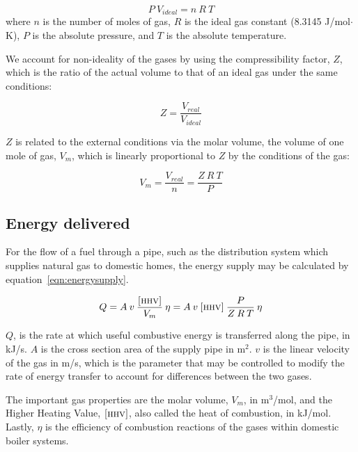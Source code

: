 \documentclass[5p]{elsarticle} %
\begin{document}
\begin{equation}
    \label{eqn:ideal}
    P \: V_{ideal} = n \: R \: T
\end{equation}
where $n$ is the number of moles of gas, $R$ is the ideal gas constant (8.3145 J/mol$\cdot$K), $P$ is the absolute pressure, and $T$ is the absolute temperature.

We account for non-ideality of the gases by using the compressibility factor, $Z$, which is the ratio of the actual volume to that of an ideal gas under the same conditions:

\begin{equation}
    \label{eqn:compressiblity}
    Z = \frac{V_{real}}{V_{ideal}}
\end{equation}

$Z$ is related to the external conditions via the molar volume, the volume of one mole of gas, $V_m$, which is linearly proportional to $Z$ by the conditions of the gas:

\begin{equation}
    \label{eqn:molarvol}
    V_m = \frac{V_{real}}{n} = \frac{Z \: R \: T}{P}
\end{equation}

\subsection{Energy delivered}
\label{sec:energydelivered}

For the flow of a fuel through a pipe, such as the distribution system which supplies natural gas to domestic homes, the energy supply may be calculated by equation~\eqref{eqn:energysupply}.

\begin{equation}
\label{eqn:energysupply}
    Q = A \: v \: \frac{\textsc{[\textsc{hhv}]}}{V_m} \: \eta
    = A \: v \: \textsc{[\textsc{hhv}]} \: \frac{P}{Z \: R \: T} \: \eta
\end{equation}

$Q$, is the rate at which useful combustive energy is transferred along the pipe, in kJ/s. 
$A$ is the cross section area of the supply pipe in m$^2$.
$v$ is the linear velocity of the gas in m/s, which is the parameter that may be controlled to modify the rate of energy transfer to account for differences between the two gases. 

The  important gas properties are the molar volume, $V_m$, in m$^3$/mol, and the Higher Heating Value, $\textsc{[\textsc{hhv}]}$, also called the heat of combustion, in kJ/mol. 
Lastly, $\eta$ is the efficiency of combustion reactions of the gases within domestic boiler systems. 
\end{document}
